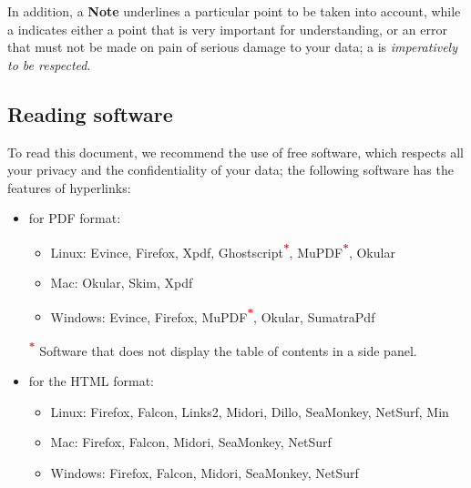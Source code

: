 


In addition, a \textbf{Note} underlines a particular point to be taken into account, while a \textcolor{red}{} indicates either a point that is very important for understanding, or an error that must not be made on pain of serious damage to your data; a \textcolor{red}{} is \emph{imperatively to be respected}.

\subsection{Reading software \label{introduction-manual-readers}}

To read this document, we recommend the use of free software, which respects all your privacy and the confidentiality of your data; the following software has the features of \gls{hyperlinks}:

\begin{itemize}
	\item for \gls{PDF} format:
		\begin{itemize}
			\item[\textopenbullet] Linux: Evince, Firefox, Xpdf, Ghostscript\textsuperscript{\textcolor{red}{\textbf{*}}}, MuPDF\textsuperscript{\textcolor{red}{\textbf{*}}}, Okular
			\item[\textopenbullet] Mac: Okular, Skim, Xpdf
			\item[\textopenbullet] Windows: Evince, Firefox, MuPDF\textsuperscript{\textcolor{red}{\textbf{*}}}, Okular, SumatraPdf
		\end{itemize}
		\textsuperscript{\textcolor{red}{\textbf{*}}} Software that does not display the table of contents in a side panel.
	\item for the \gls{HTML} format:
		\begin{itemize}
			\item[\textopenbullet] Linux: Firefox, Falcon, Links2, Midori, Dillo, SeaMonkey, NetSurf, Min
			\item[\textopenbullet] Mac: Firefox, Falcon, Midori, SeaMonkey, NetSurf
			\item[\textopenbullet] Windows: Firefox, Falcon, Midori, SeaMonkey, NetSurf
		\end{itemize}
\end{itemize}

